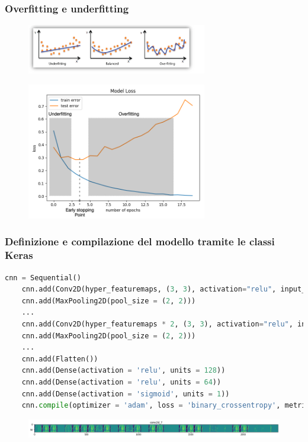 \documentclass{beamer}
\begin{document}
\begin{frame}
	\frametitle{Overfitting e underfitting}
	
	\begin{figure}
		\includegraphics[width=0.7\textwidth]{ofuf.png}
	\end{figure}

		
	\begin{figure}
		\includegraphics[width=0.7\textwidth]{ofufkeras.png}
	\end{figure}

\end{frame}


\begin{frame}[fragile]
	\frametitle{Definizione e compilazione del modello tramite le classi Keras}

\begin{lstlisting}[basicstyle=\tiny, language=Python, numbers = none]
	cnn = Sequential()
	cnn.add(Conv2D(hyper_featuremaps, (3, 3), activation="relu", input_shape=(img_width, img_height, hyper_channels)))
	cnn.add(MaxPooling2D(pool_size = (2, 2)))
	...
	cnn.add(Conv2D(hyper_featuremaps * 2, (3, 3), activation="relu", input_shape=(img_width, img_height, hyper_channels)))
	cnn.add(MaxPooling2D(pool_size = (2, 2)))
	...
	cnn.add(Flatten())
	cnn.add(Dense(activation = 'relu', units = 128))
	cnn.add(Dense(activation = 'relu', units = 64))
	cnn.add(Dense(activation = 'sigmoid', units = 1))
	cnn.compile(optimizer = 'adam', loss = 'binary_crossentropy', metrics = ['accuracy'])
\end{lstlisting}


\begin{figure}
	\includegraphics[width=1.2\textwidth]{feature extractors.png}
\end{figure}

\end{frame}
\end{document}
